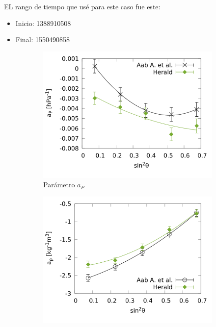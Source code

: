 			EL rango de tiempo que usé para este caso fue este: 
			\begin{itemize}
				\item Inicio: 1388910508
				\item Final: 1550490858
			\end{itemize}
			
				\begin{figure}[H]
					\begin{subfigure}[b]{0.5\textwidth}
					\includegraphics[width=\linewidth]{../Anisotropia/params/ap_2020_above_1EeV.png}
					\caption{Parámetro $a_P$ }
					\label{fig:ap_2020_1EeV}
					\end{subfigure}%
					\hspace{\fill}
					\begin{subfigure}[b]{0.5\textwidth}
					\includegraphics[width=\linewidth]{../Anisotropia/params/arho_2020_above_1EeV.png}

\end{subfigure}
\end{figure}
